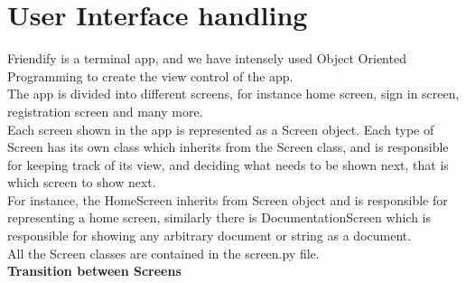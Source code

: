 \documentclass[11pt]{report}
\begin{document}
\newpage 

\section{User Interface handling}

Friendify is a terminal app, and we have intensely used Object Oriented Programming to create the view control of the app. \\

The app is divided into different screens, for instance home screen, sign in screen, registration screen and many more. \\

Each screen shown in the app is represented as a Screen object. Each type of Screen has its own class which inherits from the Screen class, and is responsible for keeping track of its view, and deciding what needs to be shown next, that is which screen to show next. \\

For instance, the HomeScreen inherits from Screen object and is responsible for representing a home screen, similarly there is DocumentationScreen which is responsible for showing any arbitrary document or string as a document. \\

All the Screen classes are contained in the screen.py file.\\

{\bf Transition between Screens}
\end{document}
